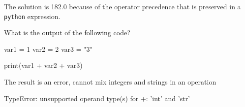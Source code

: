 \documentclass[12pt,a4paper]{exam}
\begin{document}
\begin{questions}
\begin{checkboxes}
\end{checkboxes}
\begin{solution}
The solution is 182.0 because of the operator precedence that is preserved in a \texttt{python} expression.
\end{solution}
\question
What is the output of the following code?

\begin{ipython}
var1 = 1
var2 = 2
var3 = "3"

print(var1 + var2 + var3)
\end{ipython}
\fillwithlines{3cm}
\begin{solution}
The result is an error, cannot mix integers and strings in an operation
\begin{ioutput}
TypeError: unsupported operand type(s) for +: 'int' and 'str'
\end{ioutput}
\end{solution}

\end{questions}
\end{document}
